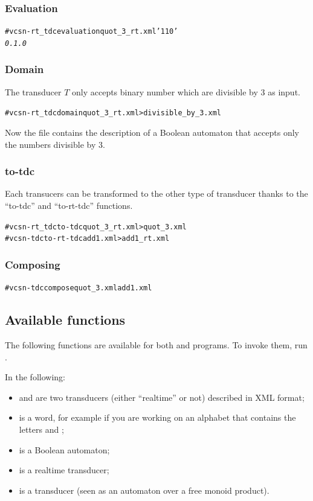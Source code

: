 \subsubsection{Evaluation}
\begin{alltt}
# vcsn-rt_tdc evaluation quot_3_rt.xml '110'
\textit{0.1.0}
\end{alltt}

\subsubsection{Domain}
The transducer $T$ only accepts binary number which are divisible by 3
as input.
\begin{alltt}
# vcsn-rt_tdc domain quot_3_rt.xml > divisible_by_3.xml
\end{alltt}
Now the file  contains the description of a
Boolean automaton that accepts only the numbers divisible by 3.

\subsubsection{to-tdc}
Each transucers can be transformed to the other type of transducer
thanks to the ``to-tdc'' and ``to-rt-tdc'' functions.
\begin{alltt}
# vcsn-rt_tdc to-tdc quot_3_rt.xml > quot_3.xml
# vcsn-tdc to-rt-tdc add1.xml > add1_rt.xml
\end{alltt}

\subsubsection{Composing}
\begin{alltt}
# vcsn-tdc compose quot_3.xml add1.xml
\end{alltt}

\subsection{Available functions}
The following functions are available for both 
and  programs.  To invoke them, run
.

\smallskip

In the following:

\begin{itemize}
\item {} and  are two transducers (either
  ``realtime'' or not) described in \Vauc XML format;
\item {} is a word, for example  if you are
  working on an alphabet that contains the letters  and
  ;
\item {} is a Boolean automaton;
\item {} is a realtime transducer;
\item {} is a transducer (seen as an automaton over a
  free monoid product).
\end{itemize}

